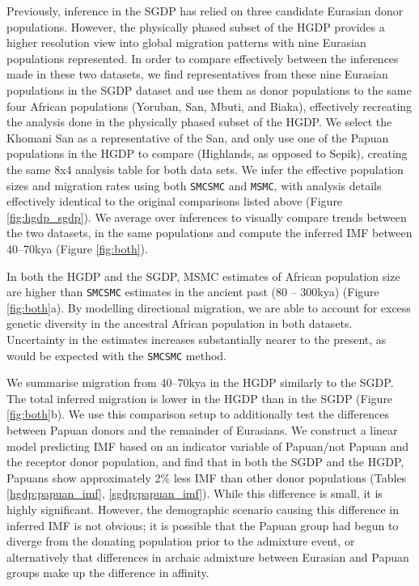 \documentclass{article}
\begin{document}
Previously, inference in the SGDP has relied on three candidate Eurasian donor populations. However, the physically phased subset of the HGDP provides a higher resolution view into global migration patterns with nine Eurasian populations represented. In order to compare effectively between the inferences made in these two datasets, we find representatives from these nine Eurasian populations in the SGDP dataset and use them as donor populations to the same four African populations (Yoruban, San, Mbuti, and Biaka), effectively recreating the analysis done in the physically phased subset of the HGDP. We select the Khomani San as a representative of the San, and only use one of the Papuan populations in the HGDP to compare (Highlands, as opposed to Sepik), creating the same 8x4 analysis table for both data sets. We infer the effective population sizes and migration rates using both {\tt SMCSMC} and {\tt MSMC}, with analysis details effectively identical to the original comparisons listed above (Figure \ref{fig:hgdp_sgdp}). We average over inferences to visually compare trends between the two datasets, in the same populations and compute the inferred IMF between 40--70kya (Figure \ref{fig:both}).  

In both the HGDP and the SGDP, MSMC estimates of African population size are higher than {\tt SMCSMC} estimates in the ancient past (80 -- 300kya) (Figure \ref{fig:both}a). By modelling directional migration, we are able to account for excess genetic diversity in the ancestral African population in both datasets. Uncertainty in the estimates increases substantially nearer to the present, as would be expected with the {\tt SMCSMC} method. 

We summarise migration from 40--70kya in the HGDP similarly to the SGDP. The total inferred migration is lower in the HGDP than in the SGDP (Figure \ref{fig:both}b). We use this comparison setup to additionally test the differences between Papuan donors and the remainder of Eurasians. We construct a linear model predicting IMF based on an indicator variable of Papuan/not Papuan and the receptor donor population, and find that in both the SGDP and the HGDP, Papuans show approximately 2\% less IMF than other donor populations (Tables \ref{hgdp:papuan_imf}, \ref{sgdp:papuan_imf}). While this difference is small, it is highly significant. However, the demographic scenario causing this difference in inferred IMF is not obvious; it is possible that the Papuan group had begun to diverge from the donating population prior to the admixture event, or alternatively that differences in archaic admixture between Eurasian and Papuan groups make up the difference in affinity. 
\end{document}
